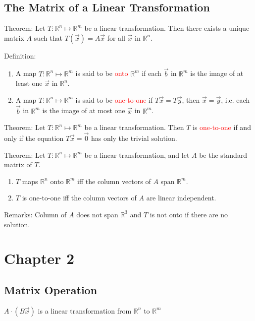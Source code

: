 \documentclass[12pt]{article}
\begin{document}
\subsection{The Matrix of a Linear Transformation}
Theorem: Let $T: \mathbb{R}^n  \longmapsto  \mathbb{R}^m$ be a linear transformation. Then there exists a unique matrix $A$ such that $T(\vec{x}) = A\vec{x}$ for all $\vec{x}$ in $\mathbb{R}^n$.

Definition: 
\begin{enumerate}
    \item A map $T: \mathbb{R}^n  \longmapsto  \mathbb{R}^m$ is said to be \textcolor{red}{onto} $\mathbb{R}^m$ if each $\vec{b}$ in $\mathbb{R}^m$ is the image of at least one $\vec{x}$ in $\mathbb{R}^n$.
    \item A map $T: \mathbb{R}^n  \longmapsto  \mathbb{R}^m$ is said to be \textcolor{red}{one-to-one} if $T\vec{x} = T\vec{y}$, then $\vec{x} = \vec{y}$, i.e. each $\vec{b}$ in $\mathbb{R}^m$ is the image of at most one $\vec{x}$ in $\mathbb{R}^m$.
\end{enumerate}

Theorem: Let $T: \mathbb{R}^n  \longmapsto  \mathbb{R}^m$ be a linear transformation. Then $T$ is \textcolor{red}{one-to-one} if and only if the equation $T\vec{x} = \vec{0}$ has only the trivial solution.


Theorem: Let $T: \mathbb{R}^n  \longmapsto  \mathbb{R}^m$ be a linear transformation, and let $A$ be the standard matrix of $T$. 
\begin{enumerate}
    \item $T$ maps $\mathbb{R}^n$ onto $\mathbb{R}^m$ iff the column vectors of $A$ span $\mathbb{R}^m$.
    \item $T$ is one-to-one iff the column vectors of $A$ are linear independent.
\end{enumerate}


Remarks: Column of $A$ does not span $\mathbb{R}^3$ and $T$ is not onto if there are no solution.




\section{Chapter 2}
\subsection{Matrix Operation}
$A\cdot(B\vec{x})$ is a linear transformation from $\mathbb{R}^n$ to $\mathbb{R}^m$
\end{document}
